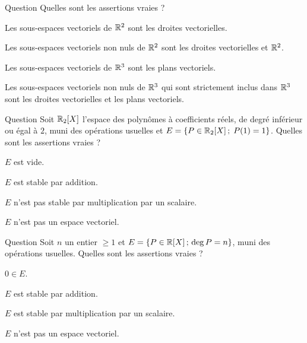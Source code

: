 \begin{multi}[multiple,feedback=
{Les sous-espaces vectoriels de \(\Rr^2\) sont : \(\{(0,0)\}\), les droites vectorielles et \(\Rr^2\). Les sous-espaces vectoriels de \(\Rr^3\) sont : \(\{(0,0,0)\}\), les droites vectorielles, les plans vectoriels et \(\Rr^3\).
}]{Question}
Quelles sont les assertions vraies ?

    \item Les sous-espaces vectoriels de \(\Rr^2\) sont les droites vectorielles.
    \item* Les sous-espaces vectoriels non nuls de \(\Rr^2\) sont les droites vectorielles et \(\Rr^2\).
    \item Les sous-espaces vectoriels de \(\Rr^3\) sont les plans vectoriels.
    \item* Les sous-espaces vectoriels non nuls de \(\Rr^3\)  qui sont strictement inclus dans \(\Rr^3\) sont les droites vectorielles et les plans vectoriels.
\end{multi}


\begin{multi}[multiple,feedback=
{\(E\) n'est pas un sous-espace vectoriel de \(\Rr_2[X]\), puisque le polynôme nul n'appartient pas à \( E\).  
\(E\) n'est stable ni par addition ni par multiplication par un scalaire.
}]{Question}
Soit \(\Rr_2[X]\) l'espace des polynômes à coefficients réels, de degré inférieur ou égal à \(2\), muni des opérations usuelles et 
\(E=\{P \in \mathbb{R}_2[X] \, ; \; P(1)=1\}\). Quelles sont les assertions vraies ?

    \item \(E\) est vide.
    \item \(E\) est stable par addition.
    \item* \(E\) n'est pas stable par multiplication par un scalaire.
    \item* \(E\) n'est pas un espace vectoriel.
\end{multi}


\begin{multi}[multiple,feedback=
{L'ensemble \(E\) n'est pas un sous-espace vectoriel de \(\Rr[X]\) car le polynôme nul n'appartient pas à \(E\) (\(\deg 0=-\infty)\). L'ensemble \(E\) n'est stable ni par addition ni par multiplication par le scalaire zéro.
}]{Question}
Soit \(n\) un entier \(\ge 1\) et  \(E=\{P \in \mathbb{R}[X] \, ; \, \deg P=n\}\), muni des opérations usuelles. Quelles sont les assertions vraies ?

    \item \(0\in E\).
    \item \(E\) est stable par addition.
    \item \(E\) est stable par multiplication par un scalaire.
    \item* \(E\) n'est pas un espace vectoriel.
\end{multi}


